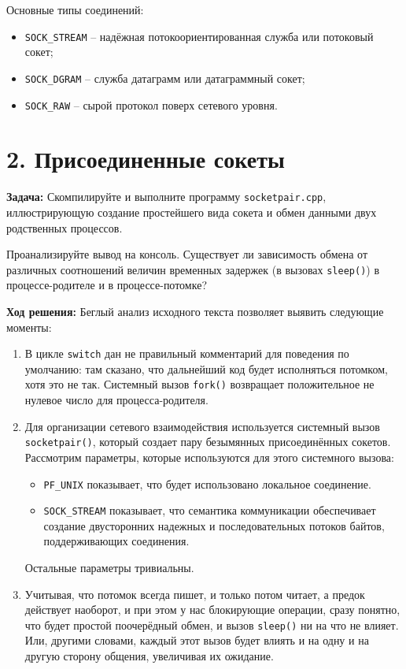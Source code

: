 Основные типы соединений:
\begin{itemize}
    \item \texttt{SOCK\_STREAM} -- надёжная потокоориентированная служба или потоковый сокет;
    \item \texttt{SOCK\_DGRAM} -- служба датаграмм или датаграммный сокет;
    \item \texttt{SOCK\_RAW} -- сырой протокол поверх сетевого уровня.
\end{itemize}

\section*{2. Присоединенные сокеты}
\textbf{Задача:} Скомпилируйте и выполните программу \texttt{socketpair.cpp}, иллюстрирующую создание простейшего вида сокета и обмен данными двух родственных процессов.

Проанализируйте вывод на консоль. Существует ли зависимость обмена от различных соотношений величин временных задержек (в вызовах \texttt{sleep()}) в процессе-родителе и в процессе-потомке?

\textbf{Ход решения:} Беглый анализ исходного текста позволяет выявить следующие моменты:
\begin{enumerate}
    \item{В цикле \texttt{switch} дан не правильный комментарий для поведения по умолчанию: там сказано, что дальнейший код будет исполняться потомком, хотя это не так. Системный вызов \texttt{fork()} возвращает положительное не нулевое число для процесса-родителя.}
    \item{Для организации сетевого взаимодействия используется системный вызов \texttt{socketpair()}, который создает пару безымянных присоединённых сокетов. Рассмотрим параметры, которые используются для этого системного вызова:
                \begin{itemize}
                    \item \texttt{PF\_UNIX} показывает, что будет использовано локальное соединение.
                    \item \texttt{SOCK\_STREAM} показывает, что семантика коммуникации обеспечивает создание двусторонних надежных и последовательных потоков байтов, поддерживающих соединения.
                \end{itemize}
                Остальные параметры тривиальны.
          }
    \item{Учитывая, что потомок всегда пишет, и только потом читает, а предок действует наоборот, и при этом у нас блокирующие операции, сразу понятно, что будет простой поочерёдный обмен, и вызов \texttt{sleep()} ни на что не влияет. Или, другими словами, каждый этот вызов будет влиять и на одну и на другую сторону общения, увеличивая их ожидание.}
\end{enumerate}

